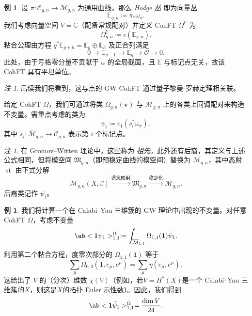 \documentclass{amsart}
\theoremstyle{definition}
\newtheorem{exm}[thm]{例}
\theoremstyle{remark}
\newtheorem{rmk}[thm]{注}
\theoremstyle{plain}
\theoremstyle{definition}
\theoremstyle{remark}
\newcommand{\C}{\mathbb{C}}
\newcommand{\E}{\mathbb{E}}
\newcommand{\Mbar}{\overline{\mathcal{M}}}
\newcommand{\mc}[1]{\mathcal{#1}}
\newcommand{\mf}[1]{\mathfrak{#1}}
\newcommand{\mbf}[1]{\mathbf{#1}}
\newcommand{\bv}{\mbf{v}}
\newcommand{\1}{\mathbf{1}}
\newcommand{\2}{\mathbf{2}}
\newcommand{\3}{\mathbf{3}}
\DeclareMathOperator{\st}{st}
\begin{document}
\begin{exm}
    设 $\pi \colon \mc{C}_{g,n} \to \Mbar_{g,n}$ 为通用曲线。那么 \textit{Hodge 丛} 即为向量丛 
    \[ \E_{g,n} \coloneqq \pi_* \omega_{\pi}. \]
我们考虑向量空间 $V = \C$（配备常规配对）并定义 CohFT $\Omega^{\E}$ 为
    \[ \Omega^{\E}_{g,n} \coloneqq c(\E_{g,n}). \]
粘合公理由方程 $q^* \E_{g+h} = \E_g \oplus \E_h$ 及正合列满足
    \[ 0 \to \E_{g-1} \to \E_g \to \mc{O} \to 0. \]
此处，由于亏格零分量不贡献于 $\omega$ 的全局截面，且 $\E$ 与标记点无关，故该 CohFT 具有平坦单位。
\end{exm}

\begin{rmk}
后续我们将看到，这与点的 GW CohFT 通过量子黎曼-罗赫定理相关联。
\end{rmk}

给定 CohFT $\Omega$，我们可通过将类 $\Omega_{g,n}(\bv)$ 与 $\Mbar_{g,n}$ 上的各类上同调配对来构造不变量。需重点考虑的类为
\[ \bar{\psi}_i \coloneqq c_1( s_i^* \omega_{\pi} ), \]
其中 $s_i \colon \Mbar_{g,n} \to \mc{C}_{g,n}$ 表示第 $i$ 个标记点。

\begin{rmk}
在 Gromov--Witten 理论中，这些称为 \textit{祖先}。此外还有后裔，其定义与上述公式相同，但将模空间 $\mf{M}_{g,n}$（即预稳定曲线的模空间）替换为 $\Mbar_{g,n}$，其中态射 $\st$ 由下式分解
    \[ \Mbar_{g,n}(X,\beta) \xrightarrow{\text{遗忘映射}} \mf{M}_{g,n} \xrightarrow{\text{稳定化}} \Mbar_{g,n}. \]
后裔类记作 $\psi_i$。
\end{rmk}

\begin{exm}
我们将计算一个在 Calabi--Yau 三维簇的 GW 理论中出现的不变量。对任意 CohFT $\Omega$，考虑不变量
    \[ \ab<\1\bar{\psi}_1>_{1,1}^{\Omega}\coloneqq \int_{\Mbar_{1,1}} \Omega_{1,1}(\1)\bar{\psi}_1. \]
    利用第二个粘合方程，度零次部分的 $\Omega_{1,1}(\1)$ 等于
    \[ \sum_{\mu} \Omega_{0,3}(\1, e_{\mu}, e^{\mu}) = \sum_{\mu} \eta(e_{\mu}, e^{\mu}), \]
    这给出了 $V$ 的（分次）维数 $\chi(V)$（例如，若\(V = H^*(X)\)是一个 Calabi--Yau 三维簇的\(X\)，则这是\(X\)的拓扑 Euler 示性数）。因此，我们得到
    \[ \ab<\1\bar{\psi}_1>_{1,1}^{\Omega} = \frac{\dim V}{24}. \]
\end{exm}
\end{document}
